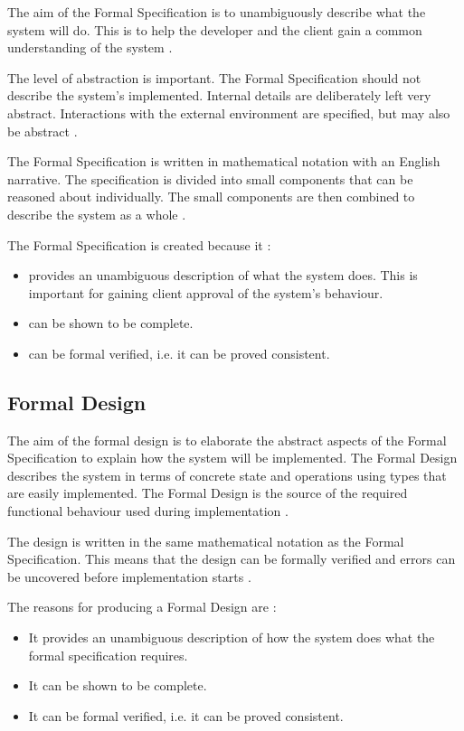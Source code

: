 The aim of the Formal Specification is to unambiguously describe what the system
will do. This is to help the developer and the client gain a common understanding
of the system \parencite{Tokeneer}.

The level of abstraction is important. The Formal Specification should not describe 
the system's implemented. Internal details are deliberately left very abstract. 
Interactions with the external environment are specified, but may also be abstract \parencite{Tokeneer}.

The Formal Specification is written in mathematical notation with an English 
narrative. The specification is divided into small components that can be reasoned
about individually. The small components are then combined to describe the system
as a whole \parencite{Tokeneer}.

The Formal Specification is created because it \parencite{Tokeneer}:
\begin{itemize}
	\item provides an unambiguous description of what the system does. This is
		important for gaining client approval of the system's behaviour.
	\item can be shown to be complete.
	\item can be formal verified, i.e. it can be proved consistent.
\end{itemize}

\subsection{Formal Design}

The aim of the formal design is to elaborate the abstract aspects of the Formal 
Specification to explain how the system will be implemented. The Formal Design 
describes the system in terms of concrete state and operations using types that
are easily implemented. The Formal Design is the source of the required functional
behaviour used during implementation  \parencite{Tokeneer}.

The design is written in the same mathematical notation as the Formal Specification.
This means that the design can be formally verified and errors can be uncovered
before implementation starts \parencite{Tokeneer}.

The reasons for producing a Formal Design are  \parencite{Tokeneer}:
\begin{itemize}
	\item It provides an unambiguous description of how the system does what the formal specification requires.
	\item It can be shown to be complete.
	\item It can be formal verified, i.e. it can be proved consistent.
\end{itemize}

